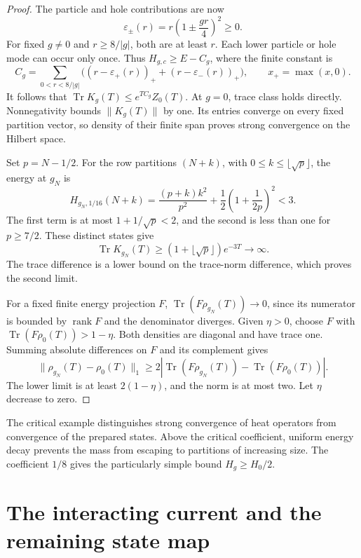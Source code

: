 \begin{proof}
The particle and hole contributions are now
\[
 \varepsilon_\pm(r)=r\left(1\pm\frac{gr}{4}\right)^2\geq0.
\]
For fixed \(g\ne0\) and \(r\geq8/|g|\), both are at least
\(r\). Each lower particle or hole mode can occur only once.
Thus \(H_{g,c}\geq E-C_g\), where the finite constant is
\[
 C_g=\sum_{0<r<8/|g|}
 \bigl((r-\varepsilon_+(r))_+
       +(r-\varepsilon_-(r))_+\bigr),\qquad x_+=\max(x,0).
\]
It follows that \(\operatorname{Tr}K_g(T)\leq e^{TC_g}Z_0(T)\).
At \(g=0\), trace class holds directly. Nonnegativity bounds
\(\|K_g(T)\|\) by one. Its entries converge on every fixed
partition vector, so density of their finite span proves strong
convergence on the Hilbert space.

Set \(p=N-1/2\). For the row partitions \((N+k)\), with
\(0\leq k\leq\lfloor\sqrt p\rfloor\), the energy at \(g_N\) is
\begin{equation}\label{eq:vol2-critical-row-energy}
 H_{g_N,1/16}(N+k)
 =\frac{(p+k)k^2}{p^2}
       +\frac12\left(1+\frac1{2p}\right)^2<3.
\end{equation}
The first term is at most \(1+1/\sqrt p<2\), and the second
is less than one for \(p\geq7/2\). These distinct states give
\[
 \operatorname{Tr}K_{g_N}(T)
 \geq(1+\lfloor\sqrt p\rfloor)e^{-3T}\longrightarrow\infty.
\]
The trace difference is a lower bound on the trace-norm difference,
which proves the second limit.

For a fixed finite energy projection \(F\),
\(\operatorname{Tr}(F\rho_{g_N}(T))\to0\), since its numerator
is bounded by \(\operatorname{rank}F\) and the denominator diverges.
Given \(\eta>0\), choose \(F\) with
\(\operatorname{Tr}(F\rho_0(T))>1-\eta\).
Both densities are diagonal and have trace one. Summing absolute
differences on \(F\) and its complement gives
\[
 \|\rho_{g_N}(T)-\rho_0(T)\|_1
 \geq2\left|\operatorname{Tr}(F\rho_{g_N}(T))
              -\operatorname{Tr}(F\rho_0(T))\right|.
\]
The lower limit is at least \(2(1-\eta)\), and the norm is at
most two. Let \(\eta\) decrease to zero.
\end{proof}

The critical example distinguishes strong convergence of heat
operators from convergence of the prepared states. Above the
critical coefficient, uniform energy decay prevents the mass
from escaping to partitions of increasing size. The coefficient
\(1/8\) gives the particularly simple bound \(H_g\geq H_0/2\).

\section{The interacting current and the remaining state map}

